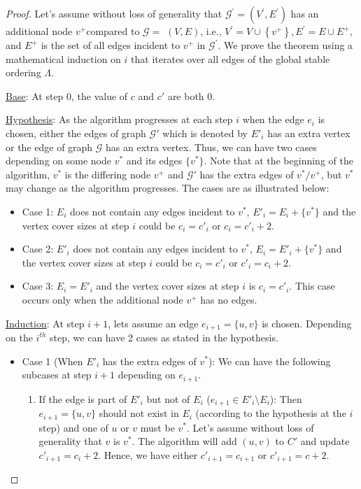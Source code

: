 \begin{proof}
Let's assume without loss of generality that
$\mathcal{G}^{\prime}=\left(V^{\prime}, E^{\prime}\right)$ has an additional node $v^{+}$compared to $\mathcal{G}=$ $(V, E)$, i.e., $V^{\prime}=V \cup\left\{v^{+}\right\}, E^{\prime}=E \cup E^{+}$, and $E^{+}$ is the set of all edges incident to $v^{+}$ in $\mathcal{G}^{\prime}$. We prove the theorem using a mathematical induction on $i$ that iterates over all edges of the global stable ordering $\Lambda$.

\underline{Base}: At step 0, the value of $c$ and $c'$ are both 0.

\underline{Hypothesis}: As the algorithm progresses at each step $i$ when the edge $e_i$ is chosen, either the edges of graph $\mathcal{G}'$ which is denoted by $E'_i$ has an extra vertex or the edge of graph $\mathcal{G}$ has an extra vertex. Thus, we can have two cases depending on some node $v^*$ and its edges $\{v^*\}$. Note that at the beginning of the algorithm, $v^*$ is the differing node $v^+$ and $\mathcal{G}'$ has the extra edges of $v^*/v^+$, but $v^*$ may change as the algorithm progresses. The cases are as illustrated below:
\begin{itemize}
    \item Case 1: $E_i$ does not contain any edges incident to $v^*$, $E'_i = E_i + \{ v^* \}$ and the vertex cover sizes at step $i$ could be $c_i = c'_i$ or $c_i = c'_i + 2$.
    \item Case 2: $E'_i$ does not contain any edges incident to $v^*$, $E_i = E'_i + \{ v^* \}$ and the vertex cover sizes at step $i$ could be $c_i = c'_i$ or $c'_i = c_i + 2$.
    \item Case 3: $E_i=E'_i$ and the vertex cover sizes at step $i$ is $c_i = c'_i$. This case occurs only when the additional node $v^+$ has no edges. 
\end{itemize}

\underline{Induction}: At step $i+1$, lets assume an edge $e_{i+1} = \{u, v\}$ is chosen. Depending on the $i^{th}$ step, we can have 2 cases as stated in the hypothesis.

\begin{itemize}
    \item Case 1 (When $E'_i$ has the extra edges of $v^*$): We can have the following subcases at step $i+1$ depending on $e_{i+1}$.
        \begin{enumerate}[label=\alph*),ref=\alph*]
            \item If the edge is part of $E'_{i}$ but not of $E_i$ ($e_{i+1} \in E'_{i} \setminus E_{i}$): Then $e_{i+1} = \{u, v\}$ should not exist in $E_i$ (according to the hypothesis at the $i$ step) and one of $u$ or $v$ must be $v^*$. Let's assume without loss of generality that $v$ is $v^*$. The algorithm will add $(u, v)$ to $C'$ and update $c'_{i+1} = c_i + 2$. Hence, we have either $c'_{i+1} = c_{i+1}$ or $c'_{i+1} = c + 2$.


\end{enumerate}
\end{itemize}
\end{proof}
